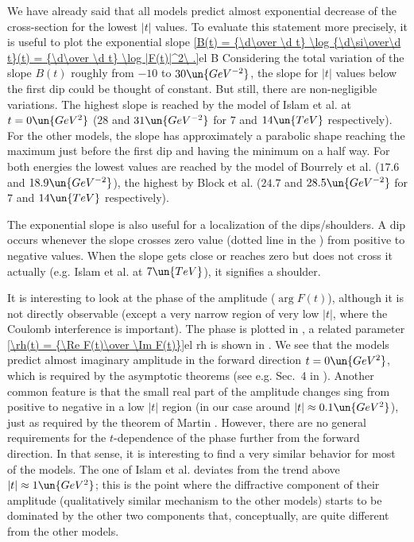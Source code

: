 

 

We have already said that all models predict almost exponential decrease of the cross-section for the lowest $|t|$ values. To evaluate this statement more precisely, it is useful to plot the exponential slope
\eqref{B(t) = {\d\over \d t} \log {\d\si\over\d t}(t) = {\d\over \d t} \log |F(t)|^2\ .}{el B}
Considering the total variation of the slope $B(t)$ roughly from $-10$ to $30\un{GeV^{-2}}$, the slope for $|t|$ values below the first dip could be thought of constant. But still, there are non-negligible variations. The highest slope is reached by the model of Islam et al. at $t=0\un{GeV^2}$ ($28$ and $31\un{GeV^{-2}}$ for $7$ and $14\un{TeV}$ respectively). For the other models, the slope has approximately a parabolic shape reaching the maximum just before the first dip and having the minimum on a half way. For both energies the lowest values are reached by the model of Bourrely et al. ($17.6$ and $18.9\un{GeV^{-2}}$), the highest by Block et al. ($24.7$ and $28.5\un{GeV^{-2}}$ for $7$ and $14\un{TeV}$ respectively).

The exponential slope is also useful for a localization of the dips/shoulders. A dip occurs whenever the slope crosses zero value (dotted line in the ) from positive to negative values. When the slope gets close or reaches zero but does not cross it actually (e.g. Islam et al. at $7\un{TeV}$), it signifies a shoulder.


It is interesting to look at the phase of the amplitude ($\arg F(t)$), although it is not directly observable (except a very narrow region of very low $|t|$, where the Coulomb interference is important). The phase is plotted in , a related parameter 
\eqref{\rh(t) = {\Re F(t)\over \Im F(t)}}{el rh}
is shown in . We see that the models predict almost imaginary amplitude in the forward direction $t=0\un{GeV^2}$, which is required by the asymptotic theorems (see e.g. Sec.~4 in ). Another common feature is that the small real part of the amplitude changes sing from positive to negative in a low $|t|$ region (in our case around $|t| \approx 0.1\un{GeV^2}$), just as required by the theorem of Martin . However, there are no general requirements for the $t$-dependence of the phase further from the forward direction. In that sense, it is interesting to find a very similar behavior for most of the models. The one of Islam et al. deviates from the trend above $|t|\approx 1\un{GeV^2}$; this is the point where the diffractive component of their amplitude (qualitatively similar mechanism to the other models) starts to be dominated by the other two components that, conceptually, are quite different from the other models.

